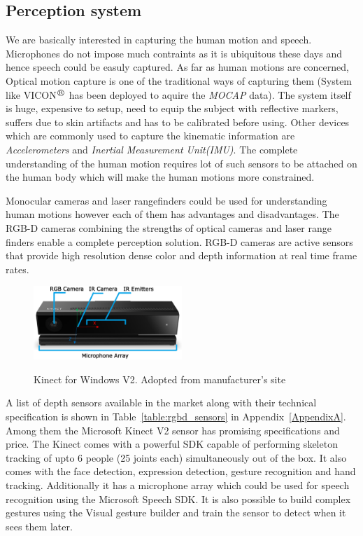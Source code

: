 \subsection{Perception system}
We are basically interested in capturing the human motion and speech. Microphones do not impose much contraints as it is ubiquitous these days and hence speech could be easuly captured. As far as human motions are concerned, Optical motion capture is one of the traditional ways of capturing them (System like VICON$^{\regmark}$ has been deployed to aquire the \emph{MOCAP} data). The system itself is huge, expensive to setup, need to equip the subject with reflective markers, suffers due to skin artifacts and has to be calibrated before using. Other devices which are commonly used to capture the kinematic information are \emph{Accelerometers} and \emph{Inertial Measurement Unit(IMU)}. The complete understanding of the human motion requires lot of such sensors to be attached on the human body which will make the human motions more constrained. 

Monocular cameras and laser rangefinders could be used for understanding human motions however each of them has advantages and disadvantages. The RGB-D cameras combining the strengths of optical cameras and laser range finders enable a complete perception solution. RGB-D cameras\cite{ren2013change} are active sensors that provide high resolution dense color and depth information at real time frame rates.
\begin{figure}[H]
\centering
\includegraphics[width=0.5\textwidth]{assets/kinectv2_parts.eps}
\label{fig:kinectv2}
\caption[Kinect for Windows V2]{Kinect for Windows V2. {Adopted from manufacturer's site}}
\end{figure}

A list of depth sensors available in the market along with their technical specification is shown in Table~\ref{table:rgbd_sensors} in Appendix~\ref{AppendixA}. Among them the Microsoft Kinect V2 \cite{Kinect2014} sensor has promising specifications and price. The Kinect comes with a powerful SDK \cite{KinectSDK2014} capable of performing skeleton tracking of upto 6 people (25 joints each) simultaneously out of the box. It also comes with the face detection, expression detection, gesture recognition and hand tracking. Additionally it has a microphone array which could be used for speech recognition using the Microsoft Speech SDK. It is also possible to build complex gestures using the Visual gesture builder and train the sensor to detect when it sees them later. 

